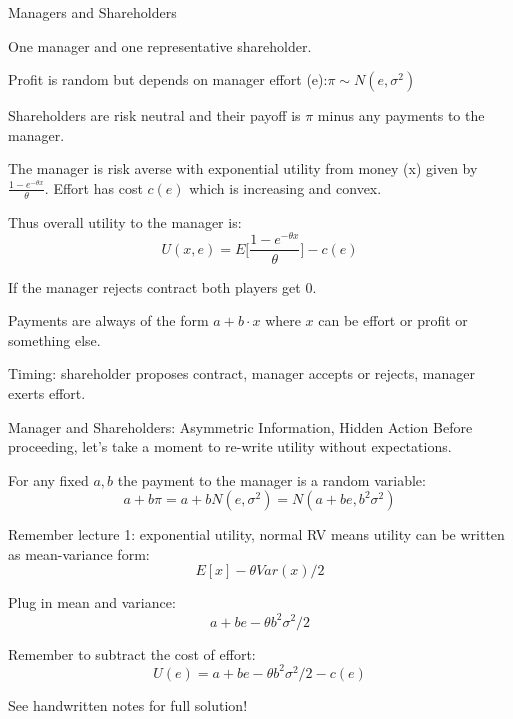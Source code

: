 \documentclass[aspectratio=169]{beamer}
\newenvironment{wideitemize}{\itemize\addtolength{\itemsep}{10pt}}{\enditemize}
\begin{document}
\begin{frame}{Managers and Shareholders}

\begin{wideitemize}
    \item One manager and one representative shareholder.
    \item Profit is random but depends on manager effort (e):$\pi \sim N(e,\sigma^2) $
    \item Shareholders are risk neutral and their payoff is $\pi $ minus any payments to the manager.
    \item The manager is risk averse with exponential utility from money (x) given by $ \frac{1-e^{-\theta x}}{\theta} $. Effort has cost $c(e)$ which is increasing and convex.
    \item Thus overall utility to the manager is:
    \[U(x,e) = E \bigg [ \frac{1-e^{-\theta x}}{\theta} \bigg ]  - c(e)\]
    \item If the manager rejects contract both players get 0.
    \item Payments are always of the form $a+b\cdot x$ where $x$ can be effort or profit or something else.
    \item Timing: shareholder proposes contract, manager accepts or rejects, manager exerts effort.
\end{wideitemize}
    
\end{frame}

\begin{frame}{Manager and Shareholders: Asymmetric Information, Hidden Action}
Before proceeding, let's take a moment to re-write utility without expectations.
\begin{wideitemize}
    \item For any fixed $a,b$ the payment to the manager is a random variable:
    \[a+b\pi = a+bN(e, \sigma^2)=N(a+be, b^2\sigma^2)\]
    \item Remember lecture 1:  exponential utility, normal RV means utility can be written as mean-variance form:
    \[E[x] - \theta Var(x)/2\]
    \item Plug in mean and variance:
    \[a+be - \theta b^2\sigma^2/2\]
    \item Remember to subtract the cost of effort:
    \[U(e)=a+be - \theta b^2\sigma^2/2-c(e)\]
    \item See handwritten notes for full solution!
\end{wideitemize}
\end{frame}
\end{document}
